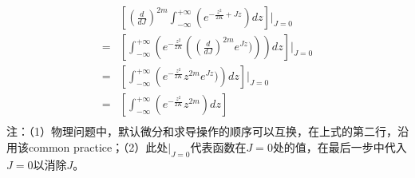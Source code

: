 \begin{equation}
    \begin{split}
       &\left[
            (\frac{d}{dJ})^{2m} \int_{-\infty}^{+\infty}{
                (e^{-\frac{z^2}{2K} + Jz})    
            dz
            }
        \right] \bigg|_{J=0} \\
        =
        &\left[
            \int_{-\infty}^{+\infty}{
                \left(
                    e^{-\frac{z^2}{2K}} 
                    \left(
                        (\frac{d}{dJ})^{2m} e^{Jz})
                    \right)
                \right)   
            dz
            }
        \right] \bigg|_{J=0} \\
        =
        &\left[
            \int_{-\infty}^{+\infty}{
                \left(
                    e^{-\frac{z^2}{2K}} 
                    z^{2m} e^{Jz})
                \right)
            dz
            }
        \right] \bigg|_{J=0} \\
        =
        &\left[
            \int_{-\infty}^{+\infty}{
                \left(
                    e^{-\frac{z^2}{2K}} 
                    z^{2m}
                \right)
            dz
            }
        \right] \\
    \end{split}
\end{equation}
注：（1）物理问题中，默认微分和求导操作的顺序可以互换，在上式的第二行，沿用该common practice；（2）此处$|_{J=0}$代表函数在$J=0$处的值，在最后一步中代入$J=0$以消除$J$。

